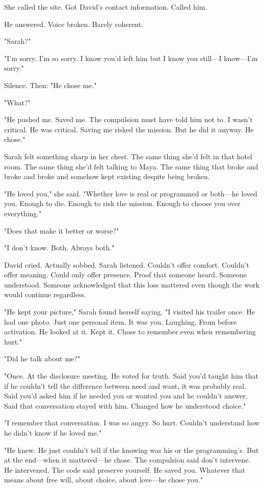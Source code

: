 She called the site. Got David's contact information. Called him.

He answered. Voice broken. Barely coherent.

"Sarah?"

"I'm sorry. I'm so sorry. I know you'd left him but I know you still—I know—I'm sorry."

Silence. Then: "He chose me."

"What?"

"He pushed me. Saved me. The compulsion must have told him not to. I wasn't critical. He was critical. Saving me risked the mission. But he did it anyway. He chose."

Sarah felt something sharp in her chest. The same thing she'd felt in that hotel room. The same thing she'd felt talking to Maya. The same thing that broke and broke and broke and somehow kept existing despite being broken.

"He loved you," she said. "Whether love is real or programmed or both—he loved you. Enough to die. Enough to risk the mission. Enough to choose you over everything."

"Does that make it better or worse?"

"I don't know. Both. Always both."

David cried. Actually sobbed. Sarah listened. Couldn't offer comfort. Couldn't offer meaning. Could only offer presence. Proof that someone heard. Someone understood. Someone acknowledged that this loss mattered even though the work would continue regardless.

"He kept your picture," Sarah found herself saying. "I visited his trailer once. He had one photo. Just one personal item. It was you. Laughing. From before activation. He looked at it. Kept it. Chose to remember even when remembering hurt."

"Did he talk about me?"

"Once. At the disclosure meeting. He voted for truth. Said you'd taught him that if he couldn't tell the difference between need and want, it was probably real. Said you'd asked him if he needed you or wanted you and he couldn't answer. Said that conversation stayed with him. Changed how he understood choice."

"I remember that conversation. I was so angry. So hurt. Couldn't understand how he didn't know if he loved me."

"He knew. He just couldn't tell if the knowing was his or the programming's. But at the end—when it mattered—he chose. The compulsion said don't intervene. He intervened. The code said preserve yourself. He saved you. Whatever that means about free will, about choice, about love—he chose you."

